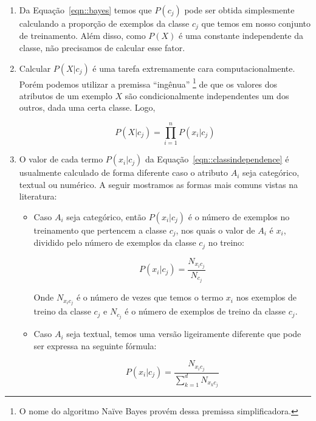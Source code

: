 \begin{enumerate}
    \item Da Equação~\ref{eqn::bayes} temos que $P(c_j)$ pode ser obtida simplesmente calculando a proporção de exemplos da classe $c_j$ que temos em nosso conjunto de treinamento. Além disso, como $P(X)$ é uma constante independente da classe, não precisamos de calcular esse fator.
       
    \item Calcular $P(X|c_j)$ é uma tarefa extremamente cara computacionalmente. Porém podemos utilizar a premissa ``ingênua'' \footnote{O nome do algoritmo Naïve Bayes provém dessa premissa simplificadora.} de que os valores dos atributos de um exemplo $X$ são condicionalmente independentes um dos outros, dada uma certa classe. Logo,

\begin{equation}\label{eqn::classindependence}
   P(X|c_{j}) = \prod^{n}_{i=1}{P(x_i|c_j) }
\end{equation}

\item O valor de cada termo $P(x_i|c_j)$ da Equação~\ref{eqn::classindependence} é usualmente calculado de forma diferente caso o atributo $A_i$ seja categórico, textual ou numérico. A seguir mostramos as formas mais comuns vistas na literatura:
    \begin{itemize}

        \item Caso $A_i$ seja categórico, então $P(x_i|c_j)$ é o número de exemplos no treinamento que pertencem a classe $c_j$, nos quais o valor de $A_i$ é $x_i$, dividido pelo número de exemplos da classe $c_j$ no treino:

    \begin{equation}\label{eqn::nbcattexto}
        P(x_i|c_j) = \frac{ N_{x_{i}c_{j}} }{ N_{c_{j}} } 
    \end{equation}
        
        Onde $N_{x_{i}c_{j}}$ é o número de vezes que temos o termo $x_i$ nos exemplos de treino da classe $c_j$ e $N_{c_{j}}$ é o número de exemplos de treino da classe $c_j$.
        
        \item Caso $A_i$ seja textual, temos uma versão ligeiramente diferente que pode ser expressa na seguinte fórmula:

    \begin{equation}\label{eqn::nbcattexto}
        P(x_i|c_j) = \frac{ N_{x_{i}c_{j}} }{ \sum\limits^{d}_{k = 1} { } N_{x_{k}c_{j}} } 
    \end{equation}


\end{itemize}
\end{enumerate}
